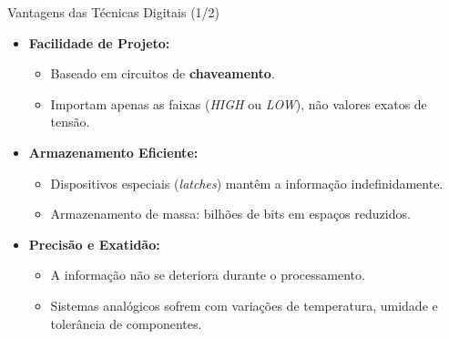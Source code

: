 \begin{frame}{Vantagens das Técnicas Digitais (1/2)}
    \begin{itemize}
        \item \textbf{Facilidade de Projeto:}
              \begin{itemize}
                  \item Baseado em circuitos de \textbf{chaveamento}.
                  \item Importam apenas as faixas (\textit{HIGH} ou \textit{LOW}), não valores exatos de tensão.
              \end{itemize}
        \item \textbf{Armazenamento Eficiente:}
              \begin{itemize}
                  \item Dispositivos especiais (\textit{latches}) mantêm a informação indefinidamente.
                  \item Armazenamento de massa: bilhões de bits em espaços reduzidos.
              \end{itemize}
        \item \textbf{Precisão e Exatidão:}
              \begin{itemize}
                  \item A informação não se deteriora durante o processamento.
                  \item Sistemas analógicos sofrem com variações de temperatura, umidade e tolerância de componentes.
              \end{itemize}
    \end{itemize}
\end{frame}

